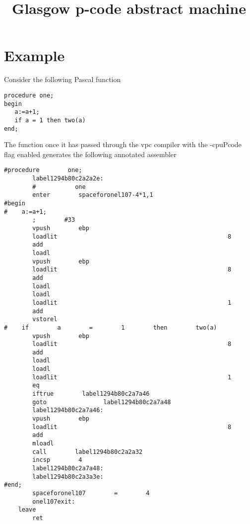 \documentclass[10pt,a4paper]{article}
\title{Glasgow        p-code        abstract        machine}
\begin{document}
\maketitle

\section{Example}
Consider        the        following        Pascal        function
\begin{verbatim}
procedure one;
begin
   a:=a+1;
   if a = 1 then two(a)
end;
\end{verbatim}
The function once it has passed through the vpc compiler with the -cpuPcode flag enabled generates the following
annotated  
assembler 
\begin{verbatim}
#procedure        one;
        label1294b80c2a2a2e:
        #	        one
        enter        spaceforonel107-4*1,1
#begin
#    a:=a+1;
        ;        #33
        vpush        ebp
        loadlit                                                8
        add        
        loadl
        vpush        ebp
        loadlit                                                8
        add        
        loadl
        loadl
        loadlit                                                1
        add        
        vstorel        
#    if        a        =        1        then        two(a)
        vpush        ebp
        loadlit                                                8
        add        
        loadl
        loadl
        loadlit                                                1
        eq
        iftrue        label1294b80c2a7a46
        goto                label1294b80c2a7a48
        label1294b80c2a7a46:
        vpush        ebp
        loadlit                                                8
        add        
        mloadl
        call        label1294b80c2a2a32
        incsp        4
        label1294b80c2a7a48:
        label1294b80c2a3a3e:
#end;
        spaceforonel107        =        4
        onel107exit:
	leave
        ret
\end{verbatim}
\end{document}

